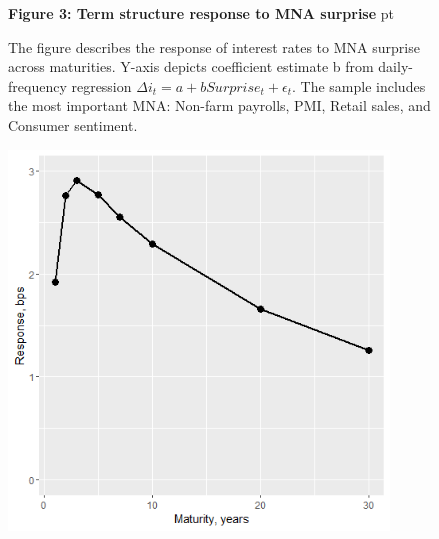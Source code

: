 \documentclass[12pt]{article}
\begin{document}
\begin{figure}[h!]
\textbf{Figure 3: Term structure response to MNA surprise}
 pt
\begin{flushleft}
{The figure describes the response of interest rates to MNA surprise across maturities. Y-axis depicts coefficient estimate b from daily-frequency regression $\Delta i_t = a + b Surprise_t + \epsilon_t.$ The sample includes the most important MNA: Non-farm payrolls, PMI, Retail sales, and Consumer sentiment.}
\end{flushleft}
\centering
\vspace{0.64cm}
\includegraphics[width=0.9\textwidth]{old_files/F2_termstructure_0.png}
\end{figure}
\end{document}
